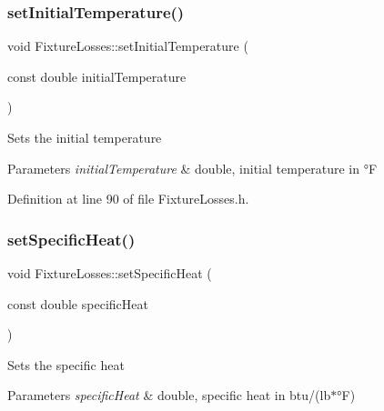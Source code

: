 \mbox{\label{class_fixture_losses_ad3f2a1013dc5da103f2bcfc1357a449b}} 
\subsubsection{\texorpdfstring{set\+Initial\+Temperature()}{setInitialTemperature()}\hspace{0.1cm}{\footnotesize\ttfamily [3/3]}}
{\footnotesize\ttfamily void Fixture\+Losses\+::set\+Initial\+Temperature (\begin{DoxyParamCaption}\item[{const double}]{initial\+Temperature }\end{DoxyParamCaption})\hspace{0.3cm}{\ttfamily [inline]}}

Sets the initial temperature 
\begin{DoxyParams}{Parameters}
{\em initial\+Temperature} & double, initial temperature in °F \\
\hline
\end{DoxyParams}


Definition at line 90 of file Fixture\+Losses.\+h.

\mbox{\label{class_fixture_losses_a946e4b6da1cca9f27e57f97688499ee1}} 
\subsubsection{\texorpdfstring{set\+Specific\+Heat()}{setSpecificHeat()}\hspace{0.1cm}{\footnotesize\ttfamily [1/3]}}
{\footnotesize\ttfamily void Fixture\+Losses\+::set\+Specific\+Heat (\begin{DoxyParamCaption}\item[{const double}]{specific\+Heat }\end{DoxyParamCaption})\hspace{0.3cm}{\ttfamily [inline]}}

Sets the specific heat 
\begin{DoxyParams}{Parameters}
{\em specific\+Heat} & double, specific heat in btu/(lb$\ast$°F) \\
\hline
\end{DoxyParams}


